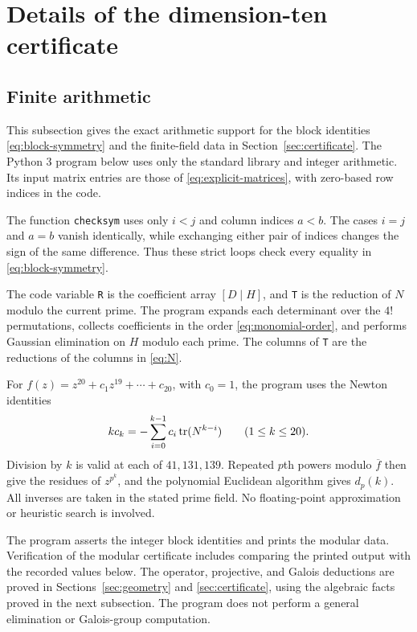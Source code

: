 \section{Details of the dimension-ten certificate}
\label{app:arithmetic}

\subsection{Finite arithmetic}

This subsection gives the exact arithmetic support for the block identities
\eqref{eq:block-symmetry} and the finite-field data in
Section~\ref{sec:certificate}.  The Python 3 program below uses only the
standard library and integer arithmetic.  Its input matrix entries are
those of \eqref{eq:explicit-matrices}, with zero-based row indices in the
code.

The function \texttt{checksym} uses only $i<j$ and column indices $a<b$.
The cases $i=j$ and $a=b$ vanish identically, while exchanging either pair
of indices changes the sign of the same difference.  Thus these strict
loops check every equality in \eqref{eq:block-symmetry}.

The code variable \texttt{R} is the coefficient array $[D\mid H]$, and
\texttt{T} is the reduction of $N$ modulo the current prime.  The program
expands each determinant over the $4!$ permutations, collects coefficients
in the order \eqref{eq:monomial-order}, and performs Gaussian elimination
on $H$ modulo each prime.  The columns of \texttt{T} are the reductions of
the columns in \eqref{eq:N}.

For $f(z)=z^{20}+c_1z^{19}+\cdots+c_{20}$, with $c_0=1$, the program uses
the Newton identities
\[
 k c_k=-\sum_{i=0}^{k-1}c_i\operatorname{tr}(N^{k-i})\qquad(1\leq k\leq20).
\]
Division by $k$ is valid at each of $41,131,139$.  Repeated $p$th powers
modulo $\overline f$ then give the residues of $z^{p^k}$, and the polynomial
Euclidean algorithm gives $d_p(k)$.  All inverses are taken in the stated
prime field.  No floating-point approximation or heuristic search is
involved.

The program asserts the integer block identities and prints the modular
data.  Verification of the modular certificate includes comparing the
printed output with the recorded values below.  The operator, projective, and Galois deductions
are proved in Sections~\ref{sec:geometry} and \ref{sec:certificate}, using
the algebraic facts proved in the next subsection.  The program does not
perform a general elimination or Galois-group computation.

